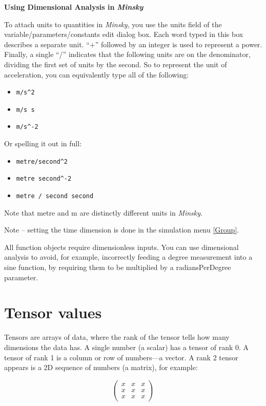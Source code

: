 \textbf{Using Dimensional Analysis in }\textbf{\emph{Minsky}}

To attach units to quantities in \emph{Minsky}, you use the units
field of the variable/parameters/constants edit dialog box. Each word
typed in this box describes a separate unit. ``\^{\ensuremath{+}}''
followed by an integer is used to represent a power. Finally, a single
``/'' indicates that the following units are on the denominator,
dividing the first set of units by the second. So to represent the
unit of acceleration, you can equivalently type all of the following:
\begin{itemize}
\item \verb+m/s^2+ 
\item \verb+m/s s+ 
\item \verb+m/s^-2+ 
\end{itemize}
Or spelling it out in full:
\begin{itemize}
\item \verb+metre/second^2+ 
\item \verb+metre second^-2+ 
\item \verb+metre / second second+ 
\end{itemize}
Note that metre and m are distinctly different units in \emph{Minsky}.

Note -- setting the time dimension is done in the simulation menu
\ref{Group}.

All function objects require dimensionless inputs. You can use dimensional
analysis to avoid, for example, incorrectly feeding a degree measurement
into a sine function, by requiring them to be multiplied by a radiansPerDegree
parameter.

\section{Tensor values}

\label{tensors}

Tensors are arrays of data, where the rank of the tensor tells how
many dimensions the data has. A single number (a scalar) has a tensor
of rank 0. A tensor of rank 1 is a column or row of numbers---a vector.
A rank 2 tensor appears is a 2D sequence of numbers (a matrix), for
example:

\[
\left(\begin{array}{ccc}
x & x & x\\
x & x & x\\
x & x & x
\end{array}\right)
\]

